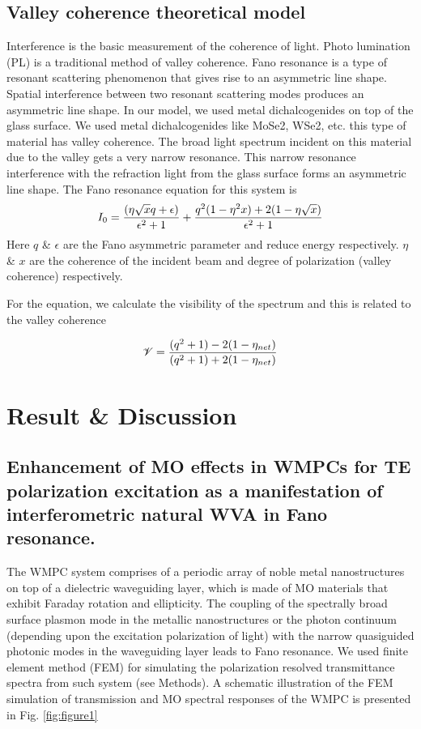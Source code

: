 \documentclass[13pt]{article}
\begin{document}
	
	\subsection{Valley coherence theoretical model}
	\noindent
	\par 
	Interference is the basic measurement of the coherence of light. Photo lumination (PL) is a traditional method of valley coherence. Fano resonance is a type of resonant scattering phenomenon that gives rise to an asymmetric line shape. Spatial interference between two resonant scattering modes produces an asymmetric line shape. In our model, we used metal dichalcogenides on top of the glass surface. We used metal dichalcogenides like MoSe2, WSe2, etc. this type of material has valley coherence. The broad light spectrum incident on this material due to the valley gets a very narrow resonance. This narrow resonance interference with the refraction light from the glass surface forms an asymmetric line shape. The Fano resonance equation for this system is 
	\begin{equation}
		\centering
		I_0 = \frac{(\eta \sqrt{x} q +\epsilon)}{\epsilon^2 + 1} + 
		\frac{q^2 (1 - \eta^2 x) + 2 (1 - \eta \sqrt{x})}{\epsilon^2 + 1}
		\label{eqs:valley coherence Fano equation}
	\end{equation}
	Here $q$ \& $\epsilon$  are the Fano asymmetric parameter and reduce energy respectively. $\eta$ \& $x$ are the coherence of the incident beam and degree of polarization (valley coherence) respectively. 
	\par 
	For the equation, we calculate the visibility of the spectrum and this is related to the valley coherence
	
	\begin{equation}
		\centering
		\mathscr{V} = \frac{(q^2 + 1) -2 (1 -\eta_{net})}{(q^2 + 1) +2 (1 - \eta_{net})}
	\end{equation}
	
	\section{Result \& Discussion}
	\noindent
	\par 
	\subsection{Enhancement of MO effects in WMPCs for TE polarization excitation as a manifestation of interferometric natural WVA in Fano resonance.}
	\noindent
	\par
	The WMPC system comprises of a periodic array of noble metal nanostructures on top of a dielectric waveguiding layer, which is made of MO materials that exhibit Faraday rotation and ellipticity. The coupling of the spectrally broad surface plasmon mode in the metallic nanostructures or the photon continuum (depending upon the excitation polarization of light) with the narrow quasiguided photonic modes in the waveguiding layer leads to Fano resonance. We used finite element method (FEM) for simulating the polarization resolved transmittance spectra from such system (see Methods\cite{1.paper}). A schematic illustration of the FEM simulation of transmission and MO spectral responses of the WMPC is presented in Fig. \ref{fig:figure1} 
	
\end{document}
